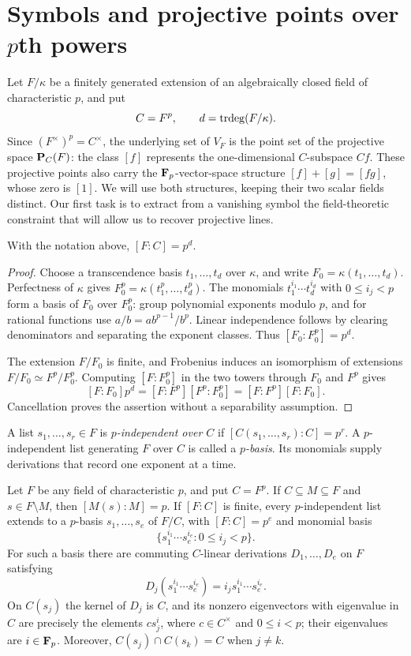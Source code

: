 \section{Symbols and projective points over \texorpdfstring{$p$}{p}th powers}
\label{sec:symbols}

Let $F/\kappa$ be a finitely generated extension of an algebraically closed
field of characteristic $p$, and put
\[
 C=F^p,\qquad d=\operatorname{trdeg}(F/\kappa).
\]
Since $(F^\times)^p=C^\times$, the underlying set of $V_F$ is the point set
of the projective space $\mathbf P_C(F)$: the class $[f]$ represents the
one-dimensional $C$-subspace $Cf$.  These projective points also carry the
$\mathbf F_p$-vector-space structure $[f]+[g]=[fg]$, whose zero is $[1]$.
We will use both structures, keeping their two scalar fields distinct.
Our first task is to extract from a vanishing symbol the field-theoretic
constraint that will allow us to recover projective lines.

\begin{lemma}\label{lem:p-degree}
With the notation above, $[F:C]=p^d$.
\end{lemma}

\begin{proof}
Choose a transcendence basis $t_1,\ldots,t_d$ over $\kappa$, and write
$F_0=\kappa(t_1,\ldots,t_d)$.  Perfectness of $\kappa$ gives
$F_0^p=\kappa(t_1^p,\ldots,t_d^p)$.  The monomials
$t_1^{i_1}\cdots t_d^{i_d}$ with $0\leq i_j<p$ form a basis of $F_0$ over
$F_0^p$: group polynomial exponents modulo $p$, and for rational functions
use $a/b=ab^{p-1}/b^p$.  Linear independence follows by clearing
denominators and separating the exponent classes.
Thus $[F_0:F_0^p]=p^d$.

The extension $F/F_0$ is finite, and Frobenius induces an isomorphism of
extensions $F/F_0\simeq F^p/F_0^p$.  Computing $[F:F_0^p]$ in the two
towers through $F_0$ and $F^p$ gives
\[
 [F:F_0]p^d=[F:F^p][F^p:F_0^p]
           =[F:F^p][F:F_0].
\]
Cancellation proves the assertion without a separability assumption.
\end{proof}

A list $s_1,\ldots,s_r\in F$ is \emph{$p$-independent over $C$} if
$[C(s_1,\ldots,s_r):C]=p^r$.  A $p$-independent list generating $F$ over
$C$ is called a \emph{$p$-basis}.  Its monomials supply derivations that
record one exponent at a time.

\begin{lemma}\label{lem:p-basis}
Let $F$ be any field of characteristic $p$, and put $C=F^p$.
If $C\subseteq M\subseteq F$ and $s\in F\setminus M$, then
$[M(s):M]=p$.  If $[F:C]$ is finite, every $p$-independent list extends to a $p$-basis
$s_1,\ldots,s_e$ of $F/C$, with $[F:C]=p^e$ and monomial basis
\[
 \{s_1^{i_1}\cdots s_e^{i_e}:0\leq i_j<p\}.
\]
For such a basis there are commuting $C$-linear derivations
$D_1,\ldots,D_e$ on $F$ satisfying
\[
 D_j(s_1^{i_1}\cdots s_e^{i_e})
       =i_j s_1^{i_1}\cdots s_e^{i_e}.
\]
On $C(s_j)$ the kernel of $D_j$ is $C$, and its nonzero eigenvectors with
eigenvalue in $C$ are precisely the elements $c s_j^i$, where
$c\in C^\times$ and $0\leq i<p$; their eigenvalues are $i\in\mathbf F_p$.
Moreover, $C(s_j)\cap C(s_k)=C$ when $j\ne k$.
\end{lemma}

